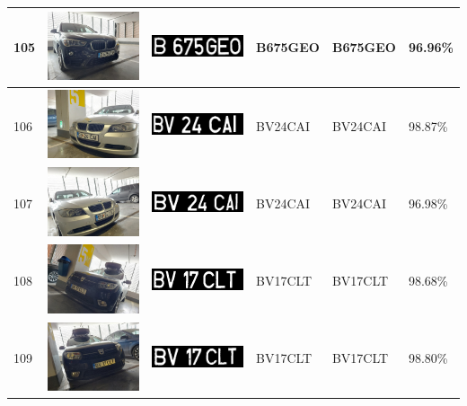\documentclass[a4paper,12pt]{report}
\begin{document}
\begin{longtable}{| m{0.6cm} | m{3cm} | m{3cm} | m{1.8cm} | m{1.8cm} | m{1.8cm} |}
        105 & \includegraphics[width=3cm,keepaspectratio]{dataset/61_s1.jpg} & \includegraphics[width=3cm,keepaspectratio]{segmentari/105.jpg} & B675GEO & B675GEO & 96.96\% \\ \hline
        106 & \includegraphics[width=3cm,keepaspectratio]{dataset/62_d1.jpg} & \includegraphics[width=3cm,keepaspectratio]{segmentari/106.jpg} & BV24CAI & BV24CAI & 98.87\% \\ \hline
        107 & \includegraphics[width=3cm,keepaspectratio]{dataset/62_s1.jpg} & \includegraphics[width=3cm,keepaspectratio]{segmentari/107.jpg} & BV24CAI & BV24CAI & 96.98\% \\ \hline
        108 & \includegraphics[width=3cm,keepaspectratio]{dataset/63_d1.jpg} & \includegraphics[width=3cm,keepaspectratio]{segmentari/108.jpg} & BV17CLT & BV17CLT & 98.68\% \\ \hline
        109 & \includegraphics[width=3cm,keepaspectratio]{dataset/63_s1.jpg} & \includegraphics[width=3cm,keepaspectratio]{segmentari/109.jpg} & BV17CLT & BV17CLT & 98.80\% \\ \hline

\end{longtable}
\end{document}
